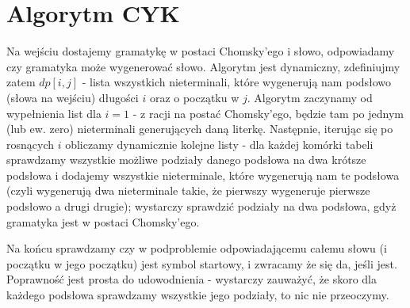 \section{Algorytm CYK}

Na wejściu dostajemy gramatykę w postaci Chomsky'ego i słowo, odpowiadamy czy gramatyka może wygenerować słowo. Algorytm jest dynamiczny, zdefiniujmy zatem \(dp[i,j]\) - lista wszystkich nieterminali, które wygenerują nam podsłowo (słowa na wejściu) długości \(i\) oraz o początku w \(j\). Algorytm zaczynamy od wypełnienia list dla \(i=1\) - z racji na postać Chomsky'ego, będzie tam po jednym (lub ew. zero) nieterminali generujących daną literkę. Następnie, iterując się po rosnących \(i\) obliczamy dynamicznie kolejne listy - dla każdej komórki tabeli sprawdzamy wszystkie możliwe podziały danego podsłowa na dwa krótsze podsłowa i dodajemy wszystkie nieterminale, które wygenerują nam te podsłowa (czyli wygenerują dwa nieterminale takie, że pierwszy wygeneruje pierwsze podsłowo a drugi drugie); wystarczy sprawdzić podziały na dwa podsłowa, gdyż gramatyka jest w postaci Chomsky'ego.

Na końcu sprawdzamy czy w podproblemie odpowiadającemu całemu słowu (i początku w jego początku) jest symbol startowy, i zwracamy że się da, jeśli jest. Poprawność jest prosta do udowodnienia - wystarczy zauważyć, że skoro dla każdego podsłowa sprawdzamy wszystkie jego podziały, to nic nie przeoczymy.